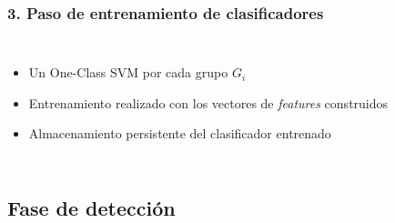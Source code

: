 \begin{frame}
    \frametitle{3. Paso de entrenamiento de clasificadores}

    \begin{columns}
        \begin{itemize}[<2->]
            \item
            Un One-Class SVM por cada grupo $G_{i}$

            \item
            Entrenamiento realizado con los vectores de \textit{features}
            construidos

            \item
            Almacenamiento persistente del clasificador entrenado
        \end{itemize}

        \begin{center}
        \end{center}
    \end{columns}
\end{frame}



\subsection{Fase de detección}

